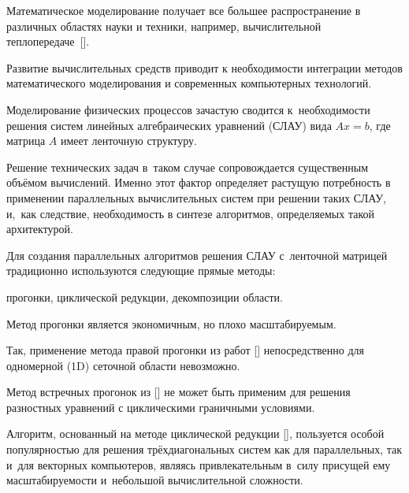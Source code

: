







\maketitle






Математическое моделирование получает все большее распространение в различных областях науки и техники, например, вычислительной теплопередаче~[]. 

Развитие вычислительных средств приводит к необходимости интеграции методов математического моделирования и современных компьютерных технологий.

Моделирование физических процессов зачастую сводится к~необходимости решения систем линейных алгебраических уравнений (СЛАУ) вида $Ax=b$, где матрица $A$ имеет ленточную структуру. 

Решение технических задач в~таком случае сопровождается существенным объёмом вычислений. Именно этот фактор определяет растущую потребность в применении параллельных вычислительных систем при решении таких СЛАУ, и,~как следствие, необходимость в синтезе алгоритмов, определяемых такой архитектурой.



Для создания параллельных алгоритмов решения СЛАУ с~ленточной матрицей  традиционно используются следующие прямые методы: 

прогонки, циклической редукции, декомпозиции области. 

Метод прогонки является экономичным, но плохо масштабируемым. 

Так, применение метода правой прогонки из работ []  непосредственно для одномерной (1D) сеточной области невозможно. 

Метод встречных прогонок из [] не может быть применим для решения разностных уравнений с циклическими граничными условиями. 

Алгоритм, основанный на методе циклической редукции [], пользуется особой популярностью для решения трёхдиагональных систем как для параллельных, так и~для векторных компьютеров, являясь привлекательным в~силу присущей ему масштабируемости и~небольшой вычислительной сложности.

